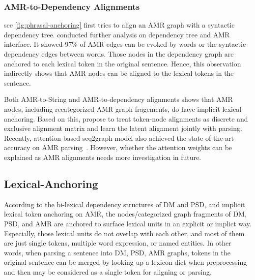 \subsubsection{AMR-to-Dependency Alignments}
\label{sssec:lex:amr2dep-align}

see \autoref{fig:phrasal-anchoring}
\citet{chen2017unsupervised} first tries to align an AMR graph with a syntactic dependency tree.
\citet{szubert2018structured} conducted further analysis on dependency
tree and AMR interface. It showed 97\% of AMR edges can be evoked by
words or the syntactic dependency edges between words.  Those nodes in
the dependency graph are anchored to each lexical token in the
original sentence. Hence, this observation indirectly shows that AMR
nodes can be aligned to the lexical tokens in the sentence.

Both AMR-to-String and AMR-to-dependency alignments shows that AMR
nodes, including recategorized AMR graph fragements, do have implicit
lexical anchoring. Based on this, \citet{lyu2018amr} propose to treat
token-node alignments as discrete and exclusive alignment matrix and
learn the latent alignment jointly with parsing. Recently,
attention-based seq2graph model also achieved the state-of-the-art
accuracy on AMR parsing~\cite{zhang-etal-2018-stog}.  However, whether
the attention weights can be explained as AMR alignments needs more
investigation in future.

\subsection{Lexical-Anchoring}
\label{ssec:lex:lex-anchor-summary}
According to the bi-lexical dependency structures of DM and PSD, and
implicit lexical token anchoring on AMR, the nodes/categorized graph
fragments of DM, PSD, and AMR are anchored to surface lexical units in
an explicit or implict way. Especially, those lexical units do not
overlap with each other, and most of them are just single tokens,
multiple word expression, or named entities. In other words, when
parsing a sentence into DM, PSD, AMR graphs, tokens in the original
sentence can be merged by looking up a lexicon dict when preprocessing
and then may be considered as a single token for aligning or parsing.

